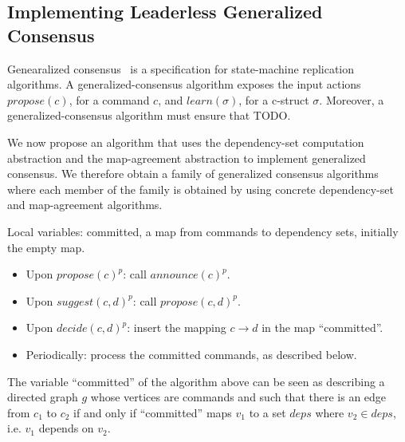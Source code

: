 \subsection{Implementing Leaderless Generalized Consensus}

Genearalized consensus~\cite{Lamport05GeneralizeConsensus} is a specification for state-machine replication algorithms. 
A generalized-consensus algorithm exposes the input actions $propose\left( c \right)$, for a command $c$, and $learn\left( \sigma \right)$, for a c-struct $\sigma$.
Moreover, a generalized-consensus algorithm must ensure that TODO.

We now propose an algorithm that uses the dependency-set computation abstraction and the map-agreement abstraction to implement generalized consensus. We therefore obtain a family of generalized consensus algorithms where each member of the family is obtained by using concrete dependency-set and map-agreement algorithms.

Local variables: committed, a map from commands to dependency sets, initially the empty map.
\begin{itemize}[noitemsep,nolistsep]
    \item Upon ${propose\left( c \right)}^p$: call ${announce\left( c \right)}^p$.
    \item Upon ${suggest\left( c,d \right)}^p$: call ${propose\left( c,d \right)}^p$.
    \item Upon ${decide\left( c,d \right)}^p$: insert the mapping $c \rightarrow d$ in the map ``committed''.
    \item Periodically: process the committed commands, as described below.
\end{itemize}

The variable ``committed'' of the algorithm above can be seen as describing a directed graph $g$ whose vertices are commands and such that there is an edge from $c_1$ to $c_2$ if and only if ``committed'' maps $v_1$ to a set $deps$ where $v_2\in deps$, i.e. $v_1$ depends on $v_2$.



\printbibliography%


